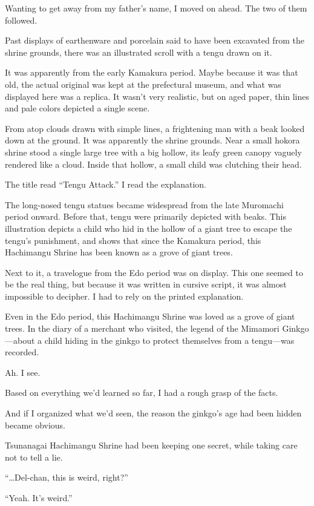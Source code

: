 \documentclass[
    a4paper,
    12pt,
    twoside,
    openany,
    UTF8,
    fontset=windows
]{ctexbook}
\begin{document}
Wanting to get away from my father's name, I moved on ahead. The two of them followed.

Past displays of earthenware and porcelain said to have been excavated from the shrine grounds, there was an illustrated scroll with a tengu drawn on it.

It was apparently from the early Kamakura period. Maybe because it was that old, the actual original was kept at the prefectural museum, and what was displayed here was a replica. It wasn't very realistic, but on aged paper, thin lines and pale colors depicted a single scene.

From atop clouds drawn with simple lines, a frightening man with a beak looked down at the ground. It was apparently the shrine grounds. Near a small hokora shrine stood a single large tree with a big hollow, its leafy green canopy vaguely rendered like a cloud. Inside that hollow, a small child was clutching their head.

The title read ``Tengu Attack.'' I read the explanation.

The long-nosed tengu statues became widespread from the late Muromachi period onward. Before that, tengu were primarily depicted with beaks. This illustration depicts a child who hid in the hollow of a giant tree to escape the tengu's punishment, and shows that since the Kamakura period, this Hachimangu Shrine has been known as a grove of giant trees.

Next to it, a travelogue from the Edo period was on display. This one seemed to be the real thing, but because it was written in cursive script, it was almost impossible to decipher. I had to rely on the printed explanation.

Even in the Edo period, this Hachimangu Shrine was loved as a grove of giant trees. In the diary of a merchant who visited, the legend of the Mimamori Ginkgo---about a child hiding in the ginkgo to protect themselves from a tengu---was recorded.

Ah. I see.

Based on everything we'd learned so far, I had a rough grasp of the facts.

And if I organized what we'd seen, the reason the ginkgo's age had been hidden became obvious.

Tsunanagai Hachimangu Shrine had been keeping one secret, while taking care not to tell a lie.

``\dots Del-chan, this is weird, right?''

``Yeah. It's weird.''
\end{document}
